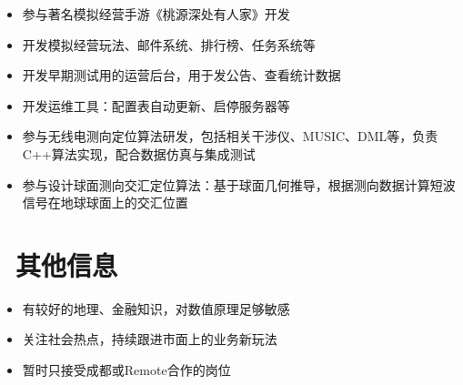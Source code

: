 \documentclass{resume}
\begin{document}
\begin{onehalfspacing}
\begin{itemize}
  \item 参与著名模拟经营手游《桃源深处有人家》开发
  \item 开发模拟经营玩法、邮件系统、排行榜、任务系统等
  \item 开发早期测试用的运营后台，用于发公告、查看统计数据
  \item 开发运维工具：配置表自动更新、启停服务器等
\end{itemize}
\end{onehalfspacing}

\begin{onehalfspacing}
\begin{itemize}
  \item 参与无线电测向定位算法研发，包括相关干涉仪、MUSIC、DML等，负责C++算法实现，配合数据仿真与集成测试
  \item 参与设计球面测向交汇定位算法：基于球面几何推导，根据测向数据计算短波信号在地球球面上的交汇位置
\end{itemize}

\end{onehalfspacing}

\section{\faInfo\ 其他信息}
\begin{itemize}[parsep=0.5ex]
  \item 有较好的地理、金融知识，对数值原理足够敏感
  \item 关注社会热点，持续跟进市面上的业务新玩法
  \item 暂时只接受成都或Remote合作的岗位
\end{itemize}

%
%
\end{document}

